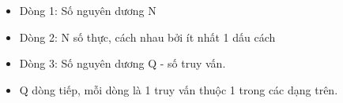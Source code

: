 \begin{itemize}
	\item     Dòng 1: Số nguyên dương N   
	\item     Dòng 2: N số thực, cách nhau bởi ít nhất 1 dấu cách   
	\item     Dòng 3: Số nguyên dương Q - số truy vấn.   
	\item     Q dòng tiếp, mỗi dòng là 1 truy vấn thuộc 1 trong các dạng trên.   
\end{itemize}